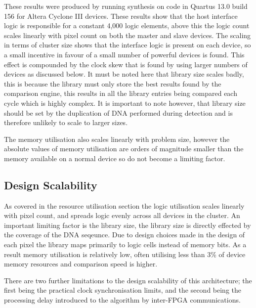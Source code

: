 \documentclass[conference]{IEEEtran}
\begin{document}
These results were produced by running synthesis on code in Quartus 13.0 build 156 for Altera Cyclone III devices. These results show that the host interface logic is responsible for a constant 4,000 logic elements, above this the logic count scales linearly with pixel count on both the master and slave devices. The scaling in terms of cluster size shows that the interface logic is present on each device, so a small incentive in favour of a small number of powerful devices is found. This effect is compounded by the clock skew that is found by using larger numbers of devices as discussed below. It must be noted here that library size scales badly, this is because the library must only store the best results found by the comparison engine, this results in all the library entries being compared each cycle which is highly complex. It is important to note however, that library size should be set by the duplication of DNA performed during detection and is therefore unlikely to scale to larger sizes. 

The memory utilisation also scales linearly with problem size, however the absolute values of memory utilisation are orders of magnitude smaller than the memory available on a normal device so do not become a limiting factor.



\subsection{Design Scalability}

As covered in the resource utilisation section the logic utilisation scales linearly with pixel count, and spreads logic evenly across all devices in the cluster. An important limiting factor is the library size, the library size is directly effected by the coverage of the DNA seqeunce. Due to design choices made in the design of each pixel the library maps primarily to logic cells instead of memory bits. As a result memory utilisation is relatively low, often utilising less than 3\% of device memory resources and comparison speed is higher. 

There are two further limitations to the design scalability of this architecture; the first being the practical clock synchronisation limits, and the second being the processing delay introduced to the algorithm by inter-FPGA communications. 
\end{document}
